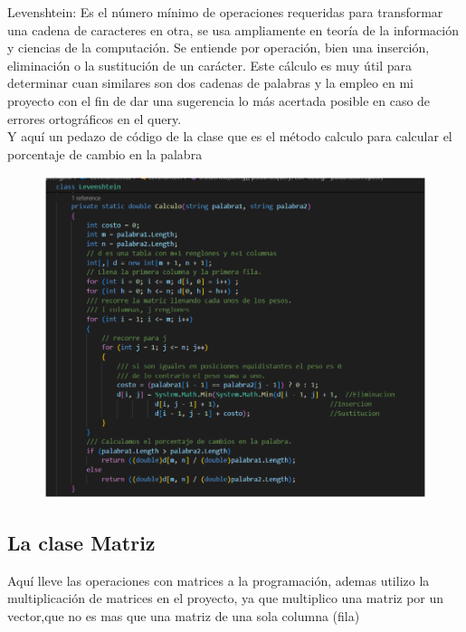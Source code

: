 \documentclass[a4paper,12pt]{article}
\begin{document}
	Levenshtein: Es el número mínimo de operaciones requeridas para transformar una cadena de caracteres en otra, se usa ampliamente en teoría de la información y ciencias de la computación. Se entiende por operación, bien una inserción, eliminación o la sustitución de un carácter. Este cálculo es muy útil para determinar cuan similares son dos cadenas de palabras y la empleo en mi proyecto con el fin de dar una sugerencia lo más acertada posible en caso de errores ortográficos en el query.\\
	
	Y aquí un pedazo de código de la clase que es el método calculo para calcular el porcentaje de cambio en la palabra
	\begin{figure}[h]
		\centering
		\includegraphics[width=14cm]{Levenshtein.png}
	\end{figure}


   \subsection{La clase Matriz}

    Aquí lleve las operaciones con matrices a la programación, ademas utilizo la multiplicación de matrices en el proyecto, ya que multiplico una matriz por un vector,que no es mas que una matriz de una sola columna (fila)\\
    
\end{document}
